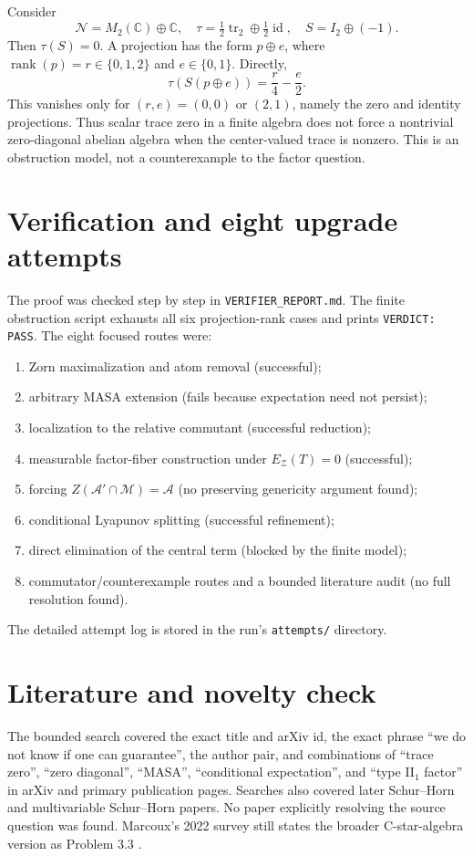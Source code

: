 \documentclass[11pt]{article}
\newcommand{\M}{\mathcal M}
\newcommand{\A}{\mathcal A}
\newcommand{\N}{\mathcal N}
\newcommand{\Z}{\mathcal Z}
\newcommand{\C}{\mathbb C}
\begin{document}
Consider
\[
 \N=M_2(\C)\oplus\C,
 \quad \tau=\tfrac12\operatorname{tr}_2\oplus\tfrac12\operatorname{id},
 \quad S=I_2\oplus(-1).
\]
Then $\tau(S)=0$. A projection has the form $p\oplus e$, where
$\operatorname{rank}(p)=r\in\{0,1,2\}$ and $e\in\{0,1\}$. Directly,
\[
 \tau(S(p\oplus e))=\frac r4-\frac e2.
\]
This vanishes only for $(r,e)=(0,0)$ or $(2,1)$, namely the zero and identity
projections. Thus scalar trace zero in a finite algebra does not force a
nontrivial zero-diagonal abelian algebra when the center-valued trace is
nonzero. This is an obstruction model, not a counterexample to the factor
question.

\section{Verification and eight upgrade attempts}

The proof was checked step by step in \texttt{VERIFIER\_REPORT.md}. The finite
obstruction script exhausts all six projection-rank cases and prints
\texttt{VERDICT: PASS}. The eight focused routes were:
\begin{enumerate}
\item Zorn maximalization and atom removal (successful);
\item arbitrary MASA extension (fails because expectation need not persist);
\item localization to the relative commutant (successful reduction);
\item measurable factor-fiber construction under $E_{\Z}(T)=0$ (successful);
\item forcing $Z(\A'\cap\M)=\A$ (no preserving genericity argument found);
\item conditional Lyapunov splitting (successful refinement);
\item direct elimination of the central term (blocked by the finite model);
\item commutator/counterexample routes and a bounded literature audit (no full
resolution found).
\end{enumerate}
The detailed attempt log is stored in the run's \texttt{attempts/} directory.

\section{Literature and novelty check}

The bounded search covered the exact title and arXiv id, the exact phrase
``we do not know if one can guarantee'', the author pair, and combinations of
``trace zero'', ``zero diagonal'', ``MASA'', ``conditional expectation'', and
``type II$_1$ factor'' in arXiv and primary publication pages. Searches also
covered later Schur--Horn and multivariable Schur--Horn papers. No paper
explicitly resolving the source question was found. Marcoux's 2022 survey
still states the broader C-star-algebra version as Problem 3.3 \cite{Mar}.
\end{document}
